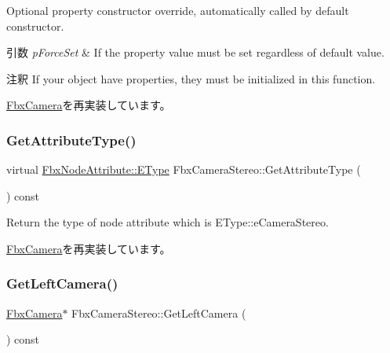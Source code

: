 Optional property constructor override, automatically called by default constructor. 
\begin{DoxyParams}{引数}
{\em p\+Force\+Set} & If the property value must be set regardless of default value. \\
\hline
\end{DoxyParams}
\begin{DoxyRemark}{注釈}
If your object have properties, they must be initialized in this function. 
\end{DoxyRemark}


\hyperlink{class_fbx_camera_a11334e5358efacbd87e4a7d78036155d}{Fbx\+Camera}を再実装しています。

\mbox{\label{class_fbx_camera_stereo_a19160f0fdeaf5407d2bc9c1608f6af53}} 
\subsubsection{\texorpdfstring{Get\+Attribute\+Type()}{GetAttributeType()}}
{\footnotesize\ttfamily virtual \hyperlink{class_fbx_node_attribute_a08e1669d3d1a696910756ab17de56d6a}{Fbx\+Node\+Attribute\+::\+E\+Type} Fbx\+Camera\+Stereo\+::\+Get\+Attribute\+Type (\begin{DoxyParamCaption}{ }\end{DoxyParamCaption}) const\hspace{0.3cm}{\ttfamily [virtual]}}



Return the type of node attribute which is E\+Type\+::e\+Camera\+Stereo. 



\hyperlink{class_fbx_camera_a1149e4b05fd079637fe8d2a66a5a7a17}{Fbx\+Camera}を再実装しています。

\mbox{\label{class_fbx_camera_stereo_a6841f71c09bdd63c7e936cdb23e818e9}} 
\subsubsection{\texorpdfstring{Get\+Left\+Camera()}{GetLeftCamera()}}
{\footnotesize\ttfamily \hyperlink{class_fbx_camera}{Fbx\+Camera}$\ast$ Fbx\+Camera\+Stereo\+::\+Get\+Left\+Camera (\begin{DoxyParamCaption}{ }\end{DoxyParamCaption}) const}

